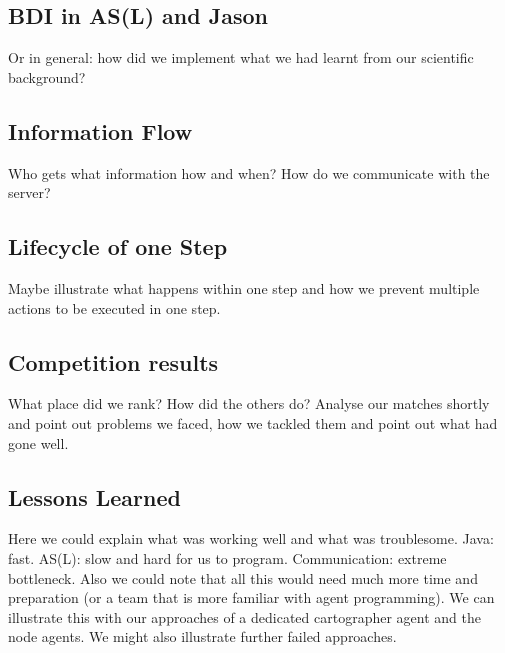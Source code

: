 \subsection{BDI in AS(L) and Jason}
Or in general: how did we implement what we had learnt from our scientific background?
\subsection{Information Flow}
Who gets what information how and when? How do we communicate with the server?
\subsection{Lifecycle of one Step}
Maybe illustrate what happens within one step and how we prevent multiple actions to be executed in one step.
\subsection{Competition results}
What place did we rank? How did the others do? Analyse our matches shortly and point out problems we faced, how we tackled them and point out what had gone well.
\subsection{Lessons Learned}
Here we could explain what was working well and what was troublesome. Java: fast. AS(L): slow and hard for us to program. Communication: extreme bottleneck. Also we could note that all this would need much more time and preparation (or a team that is more familiar with agent programming).
We can illustrate this with our approaches of a dedicated cartographer agent and the node agents. We might also illustrate further failed approaches.
